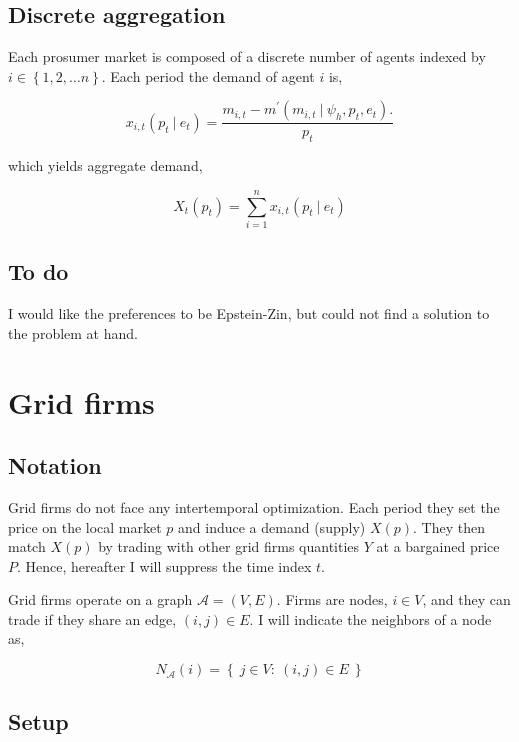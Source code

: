 \documentclass[american]{scrartcl}
\newcommand{\set}[1]{\left\{#1\right\}}
\begin{document}
\subsection{Discrete aggregation}

Each prosumer market is composed of a discrete number of agents indexed by $i \in \set{1, 2, \ldots n}$. Each period the demand of agent $i$ is,

\begin{equation}
	x_{i, t}(p_t \ \vert \ e_t) = \frac{m_{i, t} - m^\prime(m_{i, t} \ \vert \ \psi_h, p_t, e_t).}{p_t}
\end{equation}

which yields aggregate demand,

\begin{equation}
	X_t(p_t) = \sum^n_{i = 1} x_{i, t}(p_t \ \vert \ e_t)
\end{equation}


\subsection{To do}

I would like the preferences to be Epstein-Zin, but could not find a solution to the problem at hand.

\section{Grid firms}

\subsection{Notation}

Grid firms do not face any intertemporal optimization. Each period they set the price on the local market $p$ and induce a demand (supply) $X(p)$. They then match $X(p)$ by trading with other grid firms quantities $Y$ at a bargained price $P$. Hence, hereafter I will suppress the time index $t$.

Grid firms operate on a graph $\mathcal{A} = (V, E)$. Firms are nodes, $i \in V$, and they can trade if they share an edge, $(i, j) \in E$. I will indicate the neighbors of a node as,

\begin{equation}
	N_{\mathcal{A}}(i) = \set{ \ j \in V: \ (i, j) \in E \ }
\end{equation}

\subsection{Setup}
\end{document}

